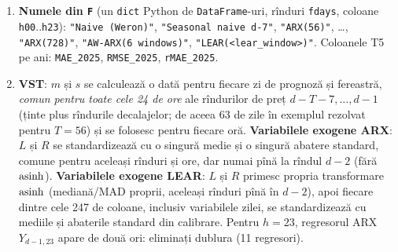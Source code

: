 \section{}
\small
\begin{enumerate}[label=\textbf{C\arabic*}]
\item {}%
{\textbf{Numele din \texttt{F}} (un \texttt{dict} Python de \texttt{DataFrame}-uri, rînduri \texttt{fdays}, coloane \texttt{h00}..\texttt{h23}): \texttt{"Naive (Weron)"}, \texttt{"Seasonal naive d-7"}, \texttt{"ARX(56)"}, \dots, \texttt{"ARX(728)"}, \texttt{"AW-ARX(6 windows)"}, \texttt{"LEAR(<lear\_window>)"}. Coloanele T5 pe ani: \texttt{MAE\_2025}, \texttt{RMSE\_2025}, \texttt{rMAE\_2025}.}
\item {}%
{\textbf{VST}: $m$ și $s$ se calculează o dată pentru fiecare zi de prognoză și fereastră, \emph{comun pentru toate cele 24 de ore} ale rîndurilor de preț $d-T-7,\dots,d-1$ (ținte plus rîndurile decalajelor; de aceea 63 de zile în exemplul rezolvat pentru $T=56$) și se folosesc pentru fiecare oră.
\textbf{Variabilele exogene ARX}: $L$ și $R$ se standardizează cu o singură medie și o singură abatere standard, comune pentru aceleași rînduri și ore, dar numai pînă la rîndul $d-2$ (fără $\operatorname{asinh}$).
\textbf{Variabilele exogene LEAR}: $L$ și $R$ primesc propria transformare $\operatorname{asinh}$ (mediană/MAD proprii, aceleași rînduri pînă în $d-2$), apoi fiecare dintre cele 247 de coloane, inclusiv variabilele zilei, se standardizează cu mediile și abaterile standard din calibrare. Pentru $h=23$, regresorul ARX $Y_{d-1,23}$ apare de două ori: eliminați dublura (11 regresori).}

\end{enumerate}
